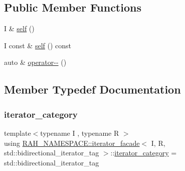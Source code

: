 \subsection*{Public Member Functions}
\begin{DoxyCompactItemize}
\item 
I \& \mbox{\hyperlink{struct_r_a_h___n_a_m_e_s_p_a_c_e_1_1iterator__facade_3_01_i_00_01_r_00_01std_1_1bidirectional__iterator__tag_01_4_a7e6b48a568ae8085b523e5d0fe82e57e}{self}} ()
\item 
I const  \& \mbox{\hyperlink{struct_r_a_h___n_a_m_e_s_p_a_c_e_1_1iterator__facade_3_01_i_00_01_r_00_01std_1_1bidirectional__iterator__tag_01_4_a48a8492fca7c439acc3030cf9b0099bc}{self}} () const
\item 
auto \& \mbox{\hyperlink{struct_r_a_h___n_a_m_e_s_p_a_c_e_1_1iterator__facade_3_01_i_00_01_r_00_01std_1_1bidirectional__iterator__tag_01_4_a8fcb087058db01ea12845a74fd2006f1}{operator-\/-\/}} ()
\end{DoxyCompactItemize}


\subsection{Member Typedef Documentation}
\mbox{\label{struct_r_a_h___n_a_m_e_s_p_a_c_e_1_1iterator__facade_3_01_i_00_01_r_00_01std_1_1bidirectional__iterator__tag_01_4_a4a4bb5297faa1c67244e7d36fffb8065}} 
\subsubsection{\texorpdfstring{iterator\_category}{iterator\_category}}
{\footnotesize\ttfamily template$<$typename I , typename R $>$ \\
using \mbox{\hyperlink{struct_r_a_h___n_a_m_e_s_p_a_c_e_1_1iterator__facade}{R\+A\+H\+\_\+\+N\+A\+M\+E\+S\+P\+A\+C\+E\+::iterator\+\_\+facade}}$<$ I, R, std\+::bidirectional\+\_\+iterator\+\_\+tag $>$\+::\mbox{\hyperlink{struct_r_a_h___n_a_m_e_s_p_a_c_e_1_1iterator__facade_3_01_i_00_01_r_00_01std_1_1forward__iterator__tag_01_4_a975db251eb3e0733ff4292fa11cc8f89}{iterator\+\_\+category}} =  std\+::bidirectional\+\_\+iterator\+\_\+tag}



